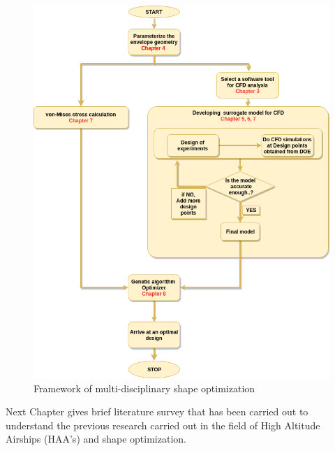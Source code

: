 \begin{figure}[H]
	\includegraphics[width=\textwidth]{layout/report_layout.png} 
	\caption{Framework of multi-disciplinary shape optimization}
	\label{Report layout} %
\end{figure}
Next Chapter gives brief literature survey that has been carried out to understand the previous research carried out in the field of High Altitude Airships (HAA's) and shape optimization.





